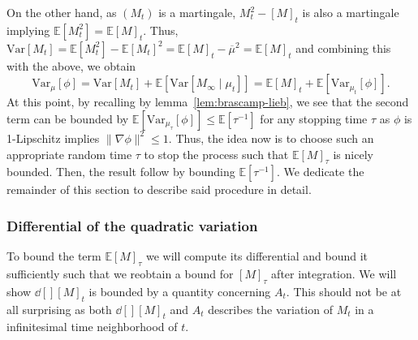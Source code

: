 On the other hand, as \((M_t)\) is a martingale, \(M_t^2 - [M]_t\) is also a martingale implying
\(\mathbb{E}[M_t^2] = \mathbb{E}[M]_t\). Thus, \(\text{Var}[M_t] = \mathbb{E}[M_t^2] - \mathbb{E}[M_t]^2 
  = \mathbb{E}[M]_t - \overline{\mu}^2 = \mathbb{E}[M]_t\) and combining this with the above, we obtain 
\begin{equation}\label{eq:bound}
  \text{Var}_\mu[\phi] = \text{Var}[M_t] + \mathbb{E}[\text{Var}[M_\infty \mid \mu_t]] 
    = \mathbb{E}[M]_t + \mathbb{E}[\text{Var}_{\mu_t}[\phi]].
\end{equation}
At this point, by recalling by lemma~\ref{lem:brascamp-lieb}, we see that the second term can be bounded 
by \(\mathbb{E}[\text{Var}_{\mu_\tau}[\phi]] \le \mathbb{E}[\tau^{-1}]\) for any stopping time \(\tau\)
as \(\phi\) is 1-Lipschitz implies \(\|\nabla \phi\|^2 \le 1\).
Thus, the idea now is to choose such an appropriate random time \(\tau\) to stop the process such that 
\(\mathbb{E}[M]_\tau\) is nicely bounded. Then, the result follow by bounding \(\mathbb{E}[\tau^{-1}]\). We dedicate 
the remainder of this section to describe said procedure in detail.

\subsubsection{Differential of the quadratic variation}

To bound the term \(\mathbb{E}[M]_\tau\) we will compute its differential and bound it 
sufficiently such that we reobtain a bound for \([M]_\tau\) after integration. 
We will show \(\dd[] [M]_t\) is bounded by a quantity concerning \(A_t\). This should not be at all 
surprising as both \(\dd[] [M]_t\) and \(A_t\) describes the variation of \(M_t\) in a infinitesimal time 
neighborhood of \(t\).

